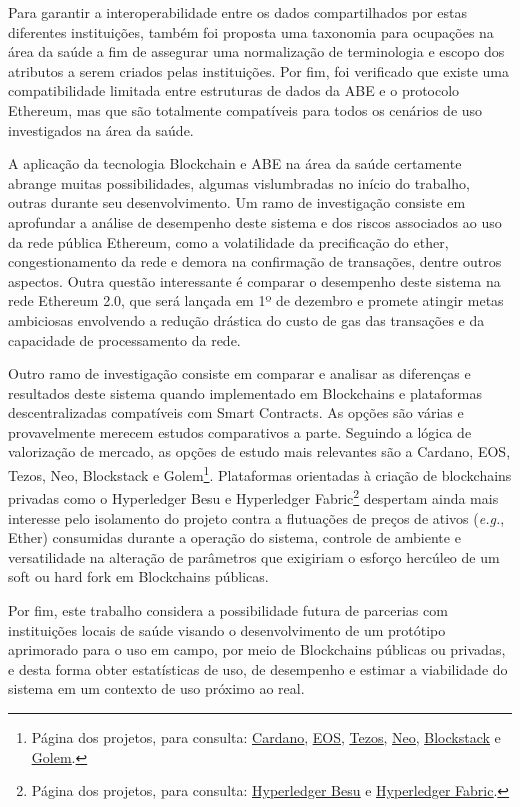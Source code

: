\documentclass[a4paper,11pt]{article}
\newcommand{\link}[2]{{\color{blue}\underline{\href{#1}{#2}}}}
\begin{document}
Para garantir a interoperabilidade entre os dados compartilhados por estas diferentes instituições, também foi proposta uma taxonomia para ocupações na área da saúde a fim de assegurar uma normalização de terminologia e escopo dos atributos a serem criados pelas instituições.
Por fim, foi verificado que existe uma compatibilidade limitada entre estruturas de dados da ABE e o protocolo Ethereum, mas que são totalmente compatíveis para todos os cenários de uso investigados na área da saúde.

A aplicação da tecnologia Blockchain e ABE na área da saúde certamente abrange muitas possibilidades, algumas vislumbradas no início do trabalho, outras durante seu desenvolvimento.
Um ramo de investigação consiste em aprofundar a análise de desempenho deste sistema e dos riscos associados ao uso da rede pública Ethereum, como a volatilidade da precificação do ether, congestionamento da rede e demora na confirmação de transações, dentre outros aspectos.
Outra questão interessante é comparar o desempenho deste sistema na rede Ethereum 2.0, que será lançada em 1º de dezembro e promete atingir metas ambiciosas envolvendo a redução drástica do custo de gas das transações e da capacidade de processamento da rede.

Outro ramo de investigação  consiste em comparar e analisar as diferenças e resultados deste sistema quando implementado em Blockchains e plataformas descentralizadas compatíveis com Smart Contracts.
As opções são várias e provavelmente merecem estudos comparativos a parte.
Seguindo a lógica de valorização de mercado, as opções de estudo mais relevantes são a Cardano, EOS, Tezos, Neo, Blockstack e Golem\footnote{Página dos projetos, para consulta: \link{https://cardano.org/}{Cardano}, \link{https://eos.io/}{EOS}, \link{https://tezos.com/}{Tezos}, \link{https://neo.org/}{Neo}, \link{https://www.blockstack.org/}{Blockstack} e \link{https://golem.network/}{Golem}.}.
Plataformas orientadas à criação de blockchains privadas como o Hyperledger Besu e Hyperledger Fabric\footnote{Página dos projetos, para consulta: \link{https://www.hyperledger.org/use/besu}{Hyperledger Besu} e \link{https://www.hyperledger.org/use/fabric}{Hyperledger Fabric}.} despertam ainda mais interesse pelo isolamento do projeto contra a flutuações de preços de ativos (\emph{e.g.}, Ether) consumidas durante a operação do sistema, controle de ambiente e versatilidade na alteração de parâmetros que exigiriam o esforço hercúleo de um soft ou hard fork em Blockchains públicas.

Por fim, este trabalho considera a possibilidade futura de parcerias com instituições locais de saúde visando o desenvolvimento de um protótipo aprimorado para o uso em campo, por meio de Blockchains públicas ou privadas, e desta forma obter estatísticas de uso, de desempenho e estimar a viabilidade do sistema em um contexto de uso próximo ao real.
\end{document}
